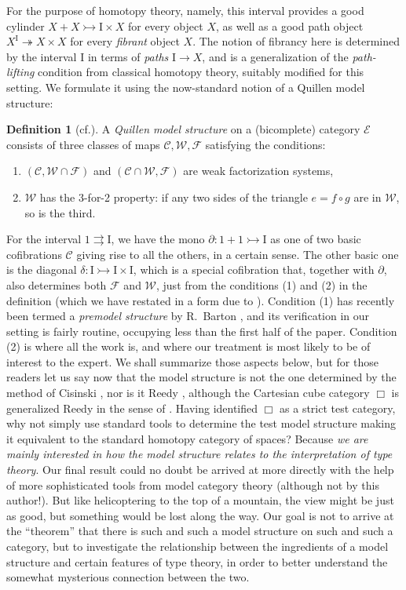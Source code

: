 \documentclass[11pt]{amsart}
\newcommand{\CC}{\ensuremath{\mathcal{C}}}
\newcommand{\WW}{\ensuremath{\mathcal{W}}}
\newcommand{\FF}{\ensuremath{\mathcal{F}}}
\newcommand{\EE}{\ensuremath{\mathcal{E}}}
\newcommand{\cof}{\ensuremath{\rightarrowtail}}
\newcommand{\fib}{\ensuremath{\twoheadrightarrow}}
\renewcommand{\to}{\ensuremath{\rightarrow}}
\newcommand{\I}{\ensuremath{\mathrm{I}}}
\newcommand{\del}{\ensuremath{\partial}}
\theoremstyle{remark}
\theoremstyle{definition}
\newtheorem{definition}[theorem]{Definition}
\begin{document}
For the purpose of homotopy theory, namely, this interval provides a good cylinder $X + X \cof \I\times X$ for every object $X$, as well as a good path object $X^\I \fib X\times X$ for every \emph{fibrant} object $X$.  The notion of fibrancy here is determined by the interval $\I$ in terms of \emph{paths} $\I\to X$, and is a generalization of the \emph{path-lifting} condition from classical homotopy theory, suitably modified for this setting. We formulate it using the now-standard notion of a Quillen model structure:

\begin{definition}[cf.\cite{Q}]\label{def:qmsviaJT}
A \emph{Quillen model structure} on a (bicomplete) category $\EE$ consists of three classes of maps $\CC, \WW, \FF$ satisfying the conditions:\begin{enumerate}
\item $(\CC, \WW\cap\FF)$ and $(\CC\cap\WW, \FF)$ are weak factorization systems,
\item $\WW$ has the 3-for-2 property: if any two sides of the triangle $e = f\circ g$ are in $\WW$, so is the third.
\end{enumerate}
\end{definition}

For the interval $1\rightrightarrows \I$, we have the mono $\del:1+1\cof \I$ as one of two basic cofibrations $\CC$ giving rise to all the others, in a certain sense.  The other basic one is the diagonal $\delta : \I\cof\I\times\I$, which is a special cofibration that, together with $\del$, also determines both $\FF$ and $\WW$, just from the conditions (1) and (2) in the definition (which we have restated in a form due to \cite{JT}).  Condition (1) has recently been termed a \emph{premodel structure} by R.\ Barton \cite{Barton}, and its verification in our setting is fairly routine, occupying less than the first half of the paper.   Condition (2) is where all the work is, and where our treatment is most likely to be of interest to the expert. We shall summarize those aspects below, but for those readers let us say now  that the model structure is not the one determined by the method of Cisinski \cite{cisinski-asterisque}, nor is it Reedy \cite{Reedy}, although the Cartesian cube category $\Box$ is generalized Reedy in the sense of \cite{M}.  Having identified $\Box$ as a strict test category, why not simply use standard tools to determine the test model structure making it equivalent to the standard homotopy category of spaces?  Because \emph{we are mainly interested in how the model structure relates to the interpretation of type theory}.  Our final result could no doubt be arrived at more directly with the help of more sophisticated tools from model category theory (although not by this author!).   But like helicoptering to the top of a mountain, the view might be just as good, but something would be lost along the way.  Our goal is not to arrive at the ``theorem'' that there is such and such a model structure on such and such a category, but to investigate the relationship between the ingredients of a model structure and certain features of type theory, in order to better understand the somewhat mysterious connection between the two.
\end{document}
